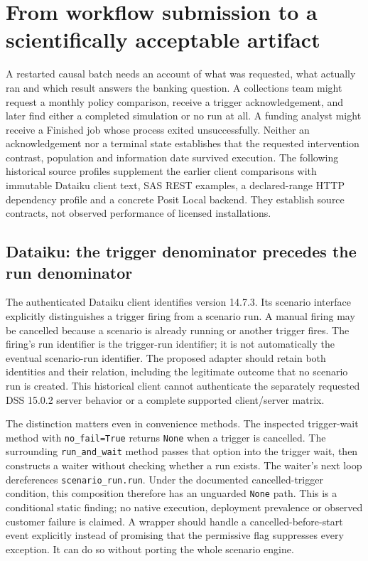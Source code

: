 \section{From workflow submission to a scientifically acceptable artifact}
\label{sec:exec24-workflow-contracts}

A restarted causal batch needs an account of what was requested, what
actually ran and which result answers the banking question. A collections
team might request a monthly policy comparison, receive a trigger
acknowledgement, and later find either a completed simulation or no run at
all. A funding analyst might receive a Finished job whose process exited
unsuccessfully. Neither an acknowledgement nor a terminal state establishes
that the requested intervention contrast, population and information date
survived execution. The following historical source profiles supplement the
earlier client comparisons with immutable Dataiku client text, SAS REST
examples, a declared-range HTTP dependency profile and a concrete Posit
Local backend. They establish source contracts, not observed performance of
licensed installations.~\citep{exec24_workflow_contracts_dataiku,
exec24_workflow_contracts_sas,exec24_workflow_contracts_domino,
exec24_workflow_contracts_posit}

\subsection{Dataiku: the trigger denominator precedes the run denominator}

The authenticated Dataiku client identifies version 14.7.3. Its scenario
interface explicitly distinguishes a trigger firing from a scenario run.
A manual firing may be cancelled because a scenario is already running or
another trigger fires. The firing's run identifier is the trigger-run
identifier; it is not automatically the eventual scenario-run identifier.
The proposed adapter should retain both identities and their relation,
including the legitimate outcome that no scenario run is created. This
historical client cannot authenticate the separately requested DSS 15.0.2
server behavior or a complete supported client/server matrix.
\citep{exec24_workflow_contracts_dataiku}

The distinction matters even in convenience methods. The inspected
trigger-wait method with \texttt{no\_fail=True} returns \texttt{None}
when a trigger is cancelled. The surrounding \texttt{run\_and\_wait}
method passes that option into the trigger wait, then constructs a waiter
without checking whether a run exists. The waiter's next loop dereferences
\texttt{scenario\_run.run}. Under the documented cancelled-trigger
condition, this composition therefore has an unguarded \texttt{None} path.
This is a conditional static finding; no native execution, deployment
prevalence or observed customer failure is claimed. A wrapper should handle
a cancelled-before-start event explicitly instead of promising that the
permissive flag suppresses every exception. It can do so without porting
the whole scenario engine.~\citep{exec24_workflow_contracts_dataiku}

